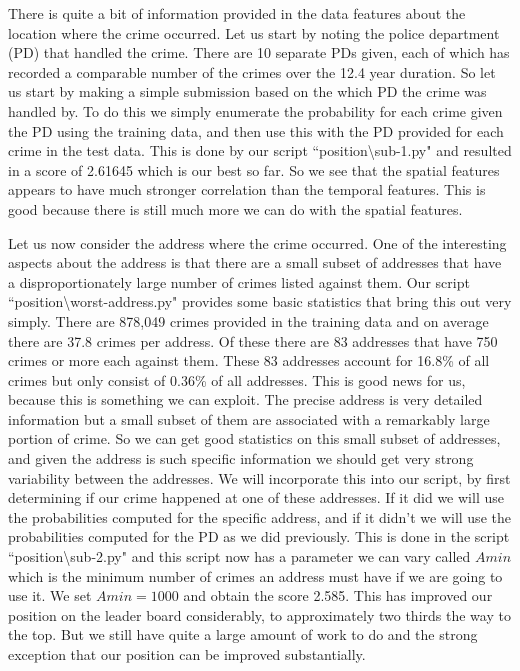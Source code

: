 \documentclass[12pt,notitlepage]{article}
\begin{document}
There is quite a bit of information provided in the data features about the location where the crime occurred. Let us start by noting the police department (PD) that handled the crime. There are 10 separate PDs given, each of which has recorded a comparable number of the crimes over the 12.4 year duration. So let us start by making a simple submission based on the which PD the crime was handled by. To do this we simply enumerate the probability for each crime given the PD using the training data, and then use this with the PD provided for each crime in the test data. This is done by our script ``position\textbackslash sub-1.py" and resulted in a score of 2.61645 which is our best so far. So we see that the spatial features appears to have much stronger correlation than the temporal features. This is good because there is still much more we can do with the spatial features.

Let us now consider the address where the crime occurred. One of the interesting aspects about the address is that there are a small subset of addresses that have a disproportionately large number of crimes listed against them. Our script ``position\textbackslash worst-address.py" provides some basic statistics that bring this out very simply. There are 878,049 crimes provided in the training data and on average there are 37.8 crimes per address. Of these there are 83 addresses that have 750 crimes or more each against them. These 83 addresses account for 16.8\% of all crimes but only consist of 0.36\% of all addresses. This is good news for us, because this is something we can exploit. The precise address is very detailed information but a small subset of them are associated with a remarkably large portion of crime. So we can get good statistics on this small subset of addresses, and given the address is such specific information we should get very strong variability between the addresses. We will incorporate this into our script, by first determining if our crime happened at one of these addresses. If it did we will use the probabilities computed for the specific address, and if it didn't we will use the probabilities computed for the PD as we did previously. This is done in the script ``position\textbackslash sub-2.py" and this script now has a parameter we can vary called $Amin$ which is the minimum number of crimes an address must have if we are going to use it. We set $Amin = 1000$ and obtain the score 2.585. This has improved our position on the leader board considerably, to approximately two thirds the way to the top. But we still have quite a large amount of work to do and the strong exception that our position can be improved substantially.
\end{document}
